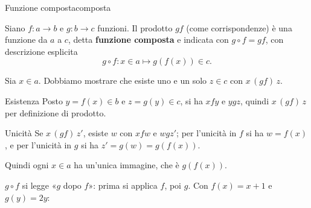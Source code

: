 \begin{concetto}
\begin{Proposizione}{Funzione composta}{composta}
    \begin{prerequisiti}
    \end{prerequisiti}
    Siano $f \colon a \to b$ e $g \colon b \to c$ funzioni. Il prodotto $gf$ (come corrispondenze) è una funzione da $a$ a $c$,
    detta \textbf{funzione composta} e indicata con $g \circ f = gf$, con descrizione esplicita
    \[ g \circ f \colon x \in a \mapsto g(f(x)) \in c. \]
\end{Proposizione}
\begin{dimostrazione}
    Sia $x \in a$. Dobbiamo mostrare che esiste uno e un solo $z \in c$ con $x \,(gf)\, z$.
    \begin{caso}{Esistenza}
        Posto $y = f(x) \in b$ e $z = g(y) \in c$, si ha $x f y$ e $y g z$, quindi $x \,(gf)\, z$ per definizione di prodotto.
    \end{caso}
    \begin{caso}{Unicità}
        Se $x \,(gf)\, z'$, esiste $w$ con $x f w$ e $w g z'$; per l'unicità in $f$ si ha $w = f(x)$, e per l'unicità in $g$
        si ha $z' = g(w) = g(f(x))$.
    \end{caso}
    Quindi ogni $x \in a$ ha un'unica immagine, che è $g(f(x))$.
\end{dimostrazione}
\end{concetto}

\begin{spiegazione}
    $g \circ f$ si legge «$g$ dopo $f$»: prima si applica $f$, poi $g$. Con $f(x) = x + 1$ e $g(y) = 2y$:
    \begin{center}
    \end{center}
\end{spiegazione}


